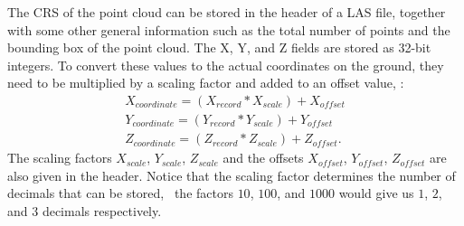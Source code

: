 The CRS of the point cloud can be stored in the header of a LAS file, together with some other general information such as the total number of points and the bounding box of the point cloud. 
The X, Y, and Z fields are stored as 32-bit integers. 
To convert these values to the actual coordinates on the ground, they need to be multiplied by a scaling factor and added to an offset value, \ie:
\begin{gather*}
  X_{coordinate} = (X_{record} * X_{scale}) + X_{offset} \\
  Y_{coordinate} = (Y_{record} * Y_{scale}) + Y_{offset} \\
  Z_{coordinate} = (Z_{record} * Z_{scale}) + Z_{offset}.
\end{gather*}
The scaling factors $X_{scale}$, $Y_{scale}$, $Z_{scale}$ and the offsets $X_{offset}$, $Y_{offset}$, $Z_{offset}$ are also given in the header. Notice that the scaling factor determines the number of decimals that can be stored, \eg\ the factors $10$, $100$, and $1000$ would give us $1$, $2$, and $3$ decimals respectively.

